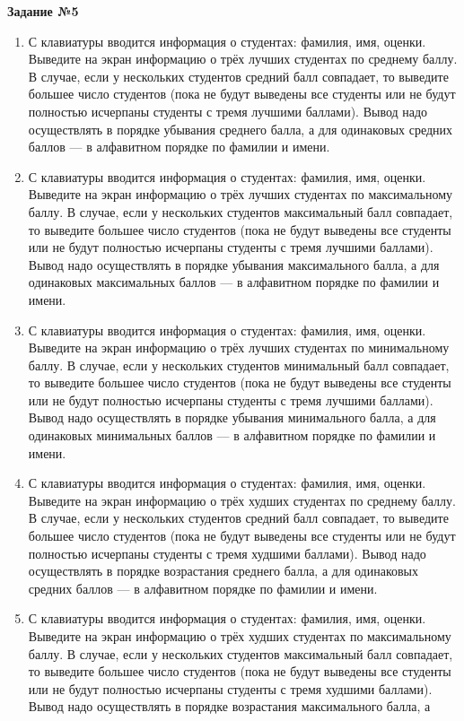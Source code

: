 \textbf{Задание №5}

\begin{enumerate}
\item С клавиатуры вводится информация о студентах: фамилия, имя, оценки. Выведите на экран информацию о трёх лучших студентах по среднему баллу. В случае,
если у нескольких студентов средний балл совпадает, то выведите большее число студентов (пока не будут выведены все студенты или
не будут полностью исчерпаны студенты с тремя лучшими баллами). Вывод надо осуществлять в порядке убывания среднего балла, а
для одинаковых средних баллов — в алфавитном порядке по фамилии и имени.
\item С клавиатуры вводится информация о студентах: фамилия, имя, оценки. Выведите на экран информацию о трёх лучших студентах по максимальному баллу. В случае,
если у нескольких студентов максимальный балл совпадает, то выведите большее число студентов (пока не будут выведены все студенты или
не будут полностью исчерпаны студенты с тремя лучшими баллами). Вывод надо осуществлять в порядке убывания максимального балла, а
для одинаковых максимальных баллов — в алфавитном порядке по фамилии и имени.
\item С клавиатуры вводится информация о студентах: фамилия, имя, оценки. Выведите на экран информацию о трёх лучших студентах по минимальному баллу. В случае,
если у нескольких студентов минимальный балл совпадает, то выведите большее число студентов (пока не будут выведены все студенты или
не будут полностью исчерпаны студенты с тремя лучшими баллами). Вывод надо осуществлять в порядке убывания минимального балла, а
для одинаковых минимальных баллов — в алфавитном порядке по фамилии и имени.
\item С клавиатуры вводится информация о студентах: фамилия, имя, оценки. Выведите на экран информацию о трёх худших студентах по среднему баллу. В случае,
если у нескольких студентов средний балл совпадает, то выведите большее число студентов (пока не будут выведены все студенты или
не будут полностью исчерпаны студенты с тремя худшими баллами). Вывод надо осуществлять в порядке возрастания среднего балла, а
для одинаковых средних баллов — в алфавитном порядке по фамилии и имени.
\item С клавиатуры вводится информация о студентах: фамилия, имя, оценки. Выведите на экран информацию о трёх худших студентах по максимальному баллу. В случае,
если у нескольких студентов максимальный балл совпадает, то выведите большее число студентов (пока не будут выведены все студенты или
не будут полностью исчерпаны студенты с тремя худшими баллами). Вывод надо осуществлять в порядке возрастания максимального балла, а

\end{enumerate}
